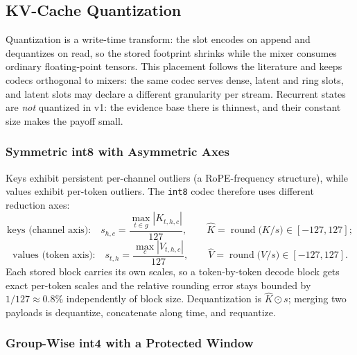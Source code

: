 \subsection{KV-Cache Quantization}
\label{sec:kv-quant}

Quantization is a write-time transform: the slot encodes on append and dequantizes on read, so the stored footprint shrinks while the mixer consumes ordinary floating-point tensors. This placement follows the literature and keeps codecs orthogonal to mixers: the same codec serves dense, latent and ring slots, and latent slots may declare a different granularity per stream. Recurrent states are \emph{not} quantized in v1: the evidence base there is thinnest, and their constant size makes the payoff small.

\subsubsection{Symmetric int8 with Asymmetric Axes}

Keys exhibit persistent per-channel outliers (a RoPE-frequency structure), while values exhibit per-token outliers. The \texttt{int8} codec therefore uses different reduction axes:
\[
\text{keys (channel axis):}\quad s_{h,c} = \frac{\max_{t\in g}|K_{t,h,c}|}{127},\qquad \hat{K} = \operatorname{round}\!\big(K/s\big)\in[-127,127];
\]
\[
\text{values (token axis):}\quad s_{t,h} = \frac{\max_{c}|V_{t,h,c}|}{127},\qquad \hat{V} = \operatorname{round}\!\big(V/s\big)\in[-127,127].
\]
Each stored block carries its own scales, so a token-by-token decode block gets exact per-token scales and the relative rounding error stays bounded by $1/127\approx 0.8\%$ independently of block size. Dequantization is $\hat{K}\odot s$; merging two payloads is dequantize, concatenate along time, and requantize.

\subsubsection{Group-Wise int4 with a Protected Window}

